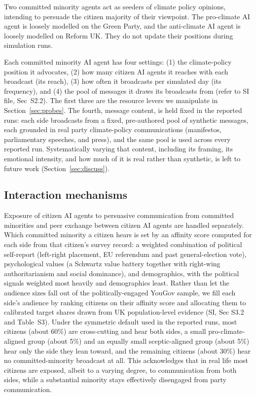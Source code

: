 \documentclass[pdflatex,sn-mathphys-num]{sn-jnl}%
\theoremstyle{thmstyleone}%
\theoremstyle{thmstyletwo}%
\theoremstyle{thmstylethree}%
\begin{document}
Two committed minority agents act as seeders of climate policy opinions, intending to
persuade the citizen majority of their viewpoint. The
pro-climate AI agent is loosely modelled on the Green Party, and the anti-climate AI
agent is loosely modelled on Reform UK. They do not update their positions during
simulation runs.

Each committed minority AI agent has four settings: (1) the climate-policy position it
advocates, (2) how many citizen AI agents it reaches with each broadcast (its reach),
(3) how often it broadcasts per simulated day (its frequency), and (4) the pool of
messages it draws its broadcasts from (refer to SI file, Sec~S2.2). The first three are
the resource levers we manipulate in Section~\ref{sec:probes}. The fourth, message
content, is held fixed in the reported runs: each side broadcasts from a fixed,
pre-authored pool of synthetic messages, each grounded in real party climate-policy
communications (manifestos, parliamentary speeches, and press), and the same pool is
used across every reported run.
Systematically varying that content, including its framing, its emotional intensity, and
how much of it is real rather than synthetic, is left to future work
(Section~\ref{sec:discuss}).


\subsection{Interaction mechanisms}\label{subsec:network}

Exposure of citizen AI agents to persuasive communication from committed minorities and
peer exchange between citizen AI agents are handled separately. Which committed minority
a citizen hears is set by an affinity score computed for each side from that citizen's
survey record: a weighted combination of political self-report (left-right placement, EU
referendum and past general-election vote), psychological values (a Schwartz value
battery together with right-wing authoritarianism and social dominance), and
demographics, with the political signals weighted most heavily and demographics least.
Rather than let the audience sizes fall out of the politically-engaged YouGov sample, we
fill each side's audience by ranking citizens on their affinity score and allocating them
to calibrated target shares drawn from UK population-level evidence (SI, Sec S3.2 and
Table~S3). Under the symmetric default used in the reported runs, most citizens (about
60\%) are cross-cutting and hear both sides, a small pro-climate-aligned group (about
5\%) and an equally small sceptic-aligned group (about 5\%) hear only the side they lean
toward, and the remaining citizens (about 30\%) hear no committed-minority broadcast at
all. This acknowledges that in real life most citizens are exposed, albeit to a varying
degree, to communication from both sides, while a substantial minority stays effectively
disengaged from party communication.
\end{document}
